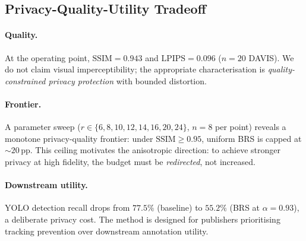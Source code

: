 \subsection{Privacy-Quality-Utility Tradeoff}

\paragraph{Quality.}
At the operating point, $\mathrm{SSIM}{=}0.943$ and $\mathrm{LPIPS}{=}0.096$ ($n{=}20$ DAVIS).
We do not claim visual imperceptibility; the appropriate characterisation is \emph{quality-constrained privacy protection} with bounded distortion.

\paragraph{Frontier.}
A parameter sweep ($r \in \{6,8,10,12,14,16,20,24\}$, $n{=}8$ per point) reveals a monotone privacy-quality frontier: under $\mathrm{SSIM}{\geq}0.95$, uniform BRS is capped at ${\sim}20\,\mathrm{pp}$.
This ceiling motivates the anisotropic direction: to achieve stronger privacy at high fidelity, the budget must be \emph{redirected}, not increased.

\paragraph{Downstream utility.}
YOLO detection recall drops from $77.5\%$ (baseline) to $55.2\%$ (BRS at $\alpha{=}0.93$), a deliberate privacy cost.
The method is designed for publishers prioritising tracking prevention over downstream annotation utility.
